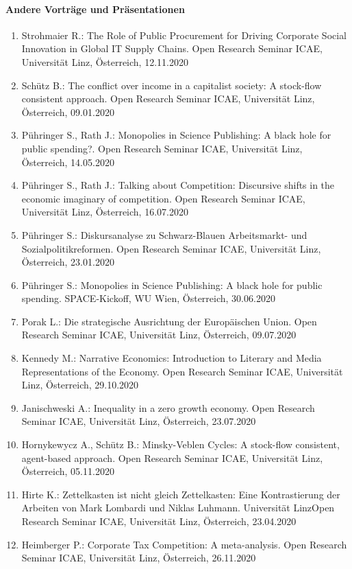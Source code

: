     \paragraph{Andere Vorträge und Präsentationen}
\begin{enumerate}
	\item Strohmaier R.: The Role of Public Procurement for Driving Corporate Social Innovation in Global IT Supply Chains. Open Research Seminar ICAE, Universität Linz, Österreich, 12.11.2020
	\item Schütz B.: The conflict over income in a capitalist society: A stock-flow consistent approach. Open Research Seminar ICAE, Universität Linz, Österreich, 09.01.2020
	\item Pühringer S., Rath J.: Monopolies in Science Publishing: A black hole for public spending?. Open Research Seminar ICAE, Universität Linz, Österreich, 14.05.2020
	\item Pühringer S., Rath J.: Talking about Competition: Discursive shifts in the economic imaginary of competition. Open Research Seminar ICAE, Universität Linz, Österreich, 16.07.2020
	\item Pühringer S.: Diskursanalyse zu Schwarz-Blauen Arbeitsmarkt- und Sozialpolitikreformen. Open Research Seminar ICAE, Universität Linz, Österreich, 23.01.2020
	\item Pühringer S.: Monopolies in Science Publishing: A black hole for public spending. SPACE-Kickoff, WU Wien, Österreich, 30.06.2020
	\item Porak L.: Die strategische Ausrichtung der Europäischen Union. Open Research Seminar ICAE, Universität Linz, Österreich, 09.07.2020
	\item Kennedy M.: Narrative Economics: Introduction to Literary and Media Representations of the Economy. Open Research Seminar ICAE, Universität Linz, Österreich, 29.10.2020
	\item Janischweski A.: Inequality in a zero growth economy. Open Research Seminar ICAE, Universität Linz, Österreich, 23.07.2020
	\item Hornykewycz A., Schütz B.: Minsky-Veblen Cycles: A stock-flow consistent, agent-based approach. Open Research Seminar ICAE, Universität Linz, Österreich, 05.11.2020
	\item Hirte K.: Zettelkasten ist nicht gleich Zettelkasten: Eine Kontrastierung  der Arbeiten von Mark Lombardi und Niklas Luhmann. Universität LinzOpen Research Seminar ICAE, Universität Linz, Österreich, 23.04.2020
	\item Heimberger P.: Corporate Tax Competition: A meta-analysis. Open Research Seminar ICAE, Universität Linz, Österreich, 26.11.2020

\end{enumerate}
